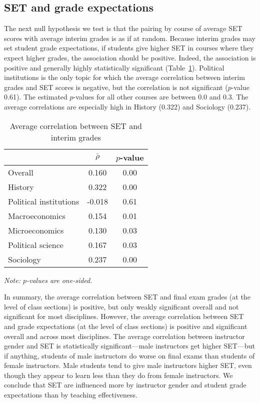 \documentclass[12pt]{article}
\begin{document}
\subsection{SET and grade expectations}
The next null hypothesis we test is that the pairing by course of average SET scores with
average interim grades is as if at random.
Because interim grades may set student grade expectations,  if
students give higher SET in courses where they expect higher grades, the association
should be positive.
Indeed, the association is positive and generally highly statistically significant 
(Table~\ref{tab:instructor_gender}). 
Political institutions is the only topic for which the average
correlation between interim grades and 
SET scores is negative, but the correlation is not significant ($p$-value 0.61). 
The estimated $p$-values for all other courses are between 0.0 and 0.3. 
The average correlations are especially high in History (0.322) and Sociology (0.237).

\begin{table}[htbp]
  \centering
  \footnotesize 
  \caption{Average correlation between SET and interim grades}
    \begin{tabular}{lcc}
    \toprule 
                          & $\bar{\rho}$  & $p$-value  \\
   \midrule
    Overall &                 0.160       & 0.00   \\
    History &                 0.322    & 0.00   \\
    Political institutions &  -0.018       & 0.61     \\
    Macroeconomics &     0.154           & 0.01    \\
    Microeconomics &      0.130          & 0.03     \\
    Political science &       0.167      & 0.03     \\
    Sociology &                0.237      & 0.00     \\
    \bottomrule
    \end{tabular}%
 \label{tab:instructor_gender}%
  
  \textit{Note: $p$-values are one-sided.}
\end{table}%
\normalsize

In summary, the average correlation between SET and final exam 
grades (at the level of class sections) is positive, 
but only weakly significant overall and not significant for most disciplines. 
However, the average correlation between SET and grade expectations 
(at the level of class sections) is positive and significant overall and across most disciplines.
The average correlation between instructor gender and SET is statistically significant---male instructors
get higher SET---but if anything, students of male instructors do worse on final exams
than students of female instructors.
Male students tend to give male instructors higher SET, even though they appear to learn less
than they do from female instructors.
We conclude that SET are influenced more by instructor gender and student grade expectations than
by teaching effectiveness.
\end{document}

